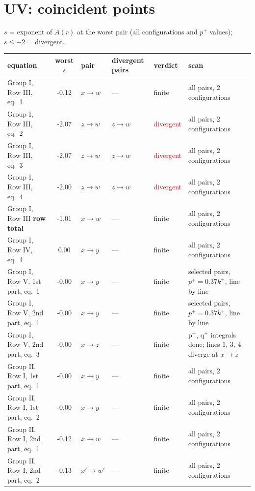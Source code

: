\documentclass[10pt]{article}
\begin{document}
\section{UV: coincident points}
$s$ = exponent of $A(r)$ at the worst pair (all configurations and $p^+$ values); $s\le-2$ = divergent.
{\small
\begin{longtable}{p{5.2cm}cp{1.6cm}p{2.4cm}p{1.4cm}p{4.2cm}}
\toprule
equation & worst $s$ & pair & divergent pairs & verdict & scan\\
\midrule
Group I, Row III, eq.~1 & -0.12 & $x\to w$ & --- & finite & {\footnotesize all pairs, 2 configurations}\\
Group I, Row III, eq.~2 & -2.07 & $z\to w$ & $z\to w$ & \textcolor{red}{divergent} & {\footnotesize all pairs, 2 configurations}\\
Group I, Row III, eq.~3 & -2.07 & $z\to w$ & $z\to w$ & \textcolor{red}{divergent} & {\footnotesize all pairs, 2 configurations}\\
Group I, Row III, eq.~4 & -2.00 & $z\to w$ & $z\to w$ & \textcolor{red}{divergent} & {\footnotesize all pairs, 2 configurations}\\
Group I, Row III \textbf{row total} & -1.01 & $x\to w$ & --- & finite & {\footnotesize all pairs, 2 configurations}\\
Group I, Row IV, eq.~1 & 0.00 & $x\to y$ & --- & finite & {\footnotesize all pairs, 2 configurations}\\
Group I, Row V, 1st part, eq.~1 & -0.00 & $x\to y$ & --- & finite & {\footnotesize selected pairs, $p^+=0.37k^+$, line by line}\\
Group I, Row V, 2nd part, eq.~1 & -0.00 & $x\to y$ & --- & finite & {\footnotesize selected pairs, $p^+=0.37k^+$, line by line}\\
Group I, Row V, 2nd part, eq.~3 & -0.00 & $x\to z$ & --- & finite & {\footnotesize p$^+$, q$^+$ integrals done; lines 1, 3, 4 diverge at $x\to z$}\\
Group II, Row I, 1st part, eq.~1 & -0.00 & $x\to y$ & --- & finite & {\footnotesize all pairs, 2 configurations}\\
Group II, Row I, 1st part, eq.~2 & -0.00 & $x\to y$ & --- & finite & {\footnotesize all pairs, 2 configurations}\\
Group II, Row I, 2nd part, eq.~1 & -0.12 & $x\to w$ & --- & finite & {\footnotesize all pairs, 2 configurations}\\
Group II, Row I, 2nd part, eq.~2 & -0.13 & $x'\to w'$ & --- & finite & {\footnotesize all pairs, 2 configurations}\\

\end{longtable}}
\end{document}
